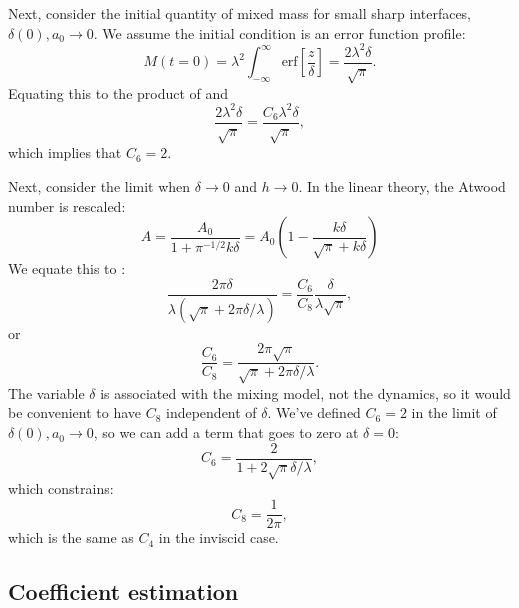 Next, consider the initial quantity of mixed mass for small sharp interfaces, $\delta(0), a_0 \rightarrow 0$.
We assume the initial condition is an error function profile:
\begin{equation}
M(t=0) = \lambda^2 \int_{-\infty}^{\infty} \text{erf}\left[\frac{z}{\delta}\right] = \frac{2\lambda^2 \delta}{\sqrt{\pi}}.
\end{equation}
Equating this to the product of  and 
\begin{equation}
\frac{2 \lambda^2 \delta}{\sqrt{\pi}}= \frac{C_6 \lambda^2 \delta}{\sqrt{\pi}},
\end{equation}
which implies that $C_6 = 2$.

Next, consider the limit when $\delta \rightarrow 0 $ and $h \rightarrow 0$.
In the linear theory, the Atwood number is rescaled:
\begin{equation}
A = \frac{A_0}{1 + \pi^{-1/2} k \delta} = A_0 \left(1 - \frac{k \delta}{\sqrt{\pi} + k \delta}\right)
\end{equation}
We equate this to :
\begin{equation}
\frac{2 \pi \delta}{\lambda (\sqrt{\pi} + 2 \pi \delta / \lambda)} = \frac{C_6 }{C_8}\frac{\delta}{\lambda \sqrt{\pi} },
\end{equation}
or
\begin{equation}
\frac{C_6}{C_8} = \frac{2 \pi \sqrt{\pi}}{\sqrt{\pi} + 2 \pi \delta / \lambda}.
\end{equation}
The variable $\delta$ is associated with the mixing model, not the dynamics, so it would be convenient to have $C_8$ independent of $\delta$.
We've defined $C_6 = 2$ in the limit of $\delta(0), a_0 \rightarrow 0$, so we can add a term that goes to zero at $\delta = 0$:
\begin{equation}
C_6 = \frac{2}{1 + 2 \sqrt{\pi} \delta / \lambda},
\end{equation}
which constrains:
\begin{equation}
C_8 = \frac{1}{2\pi},
\end{equation}
which is the same as $C_4$ in the inviscid case.

\subsection{Coefficient estimation}

